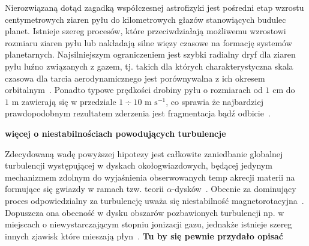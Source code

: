 \par Nierozwiązaną dotąd zagadką współczesnej astrofizyki jest pośredni etap
wzrostu centymetrowych ziaren pyłu do kilometrowych głazów stanowiących budulec
planet. Istnieje szereg procesów, które przeciwdziałają możliwemu wzrostowi
rozmiaru ziaren pyłu lub nakładają silne więzy czasowe na formację systemów
planetarnych. Najsilniejszym ograniczeniem jest szybki radialny dryf dla ziaren
pyłu luźno związanych z gazem, tj. takich dla których charakterystyczna skala
czasowa dla tarcia aerodynamicznego jest porównywalna z ich okresem
orbitalnym~\citep{W77}. Ponadto typowe prędkości drobiny pyłu o rozmiarach od
$1\textrm{ cm}$ do $1\textrm{ m}$ zawierają się w przedziale $1\div10\textrm{ m
s}^{-1}$, co sprawia że najbardziej prawdopodobnym rezultatem zderzenia jest
fragmentacja bądź odbicie~\citep{Z10}.

{\bf więcej o niestabilnościach powodujących turbulencje}

\par Zdecydowaną wadę powyższej hipotezy jest całkowite zaniedbanie globalnej
turbulencji występującej w dyskach okołogwiazdowych, będącej jedynym
mechanizmem zdolnym do wyjaśnienia obserwowanych temp akrecji materii na
formujące się gwiazdy w ramach tzw. teorii $\alpha$-dysków~\citep{SS73}.
Obecnie za dominujący proces odpowiedzialny za turbulencję uważa się niestabilność
magnetorotacyjna~\citep{BH98}. Dopuszcza ona obecność w dysku obszarów pozbawionych
turbulencji np. w miejscach o niewystarczającym stopniu jonizacji gazu, jednakże
istnieje szereg innych zjawisk które mieszają płyn~\citep{LP10}.  {\bf Tu by się
pewnie przydało opisać}



